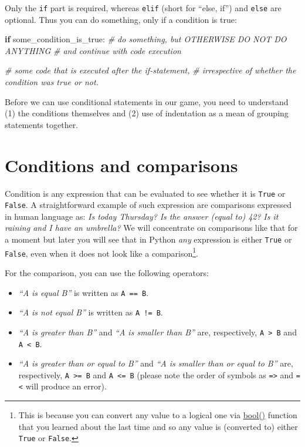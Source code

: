 \documentclass[
]{book}
\newenvironment{Shaded}{\begin{snugshade}}{\end{snugshade}}
\newcommand{\CommentTok}[1]{\textcolor[rgb]{0.56,0.35,0.01}{\textit{#1}}}
\newcommand{\ControlFlowTok}[1]{\textcolor[rgb]{0.13,0.29,0.53}{\textbf{#1}}}
\newcommand{\NormalTok}[1]{#1}
\providecommand{\tightlist}{%
  \setlength{\itemsep}{0pt}\setlength{\parskip}{0pt}}
\begin{document}
Only the \texttt{if} part is required, whereas \texttt{elif} (short for ``else, if'') and \texttt{else} are optional. Thus you can do something, only if a condition is true:

\begin{Shaded}
\begin{Highlighting}[]
\ControlFlowTok{if}\NormalTok{ some\_condition\_is\_true:}
    \CommentTok{\# do something, but OTHERWISE DO NOT DO ANYTHING }
    \CommentTok{\# and continue with code execution}
  
\CommentTok{\# some code that is executed after the if{-}statement,}
\CommentTok{\# irrespective of whether the condition was true or not.}
\end{Highlighting}
\end{Shaded}

Before we can use conditional statements in our game, you need to understand (1) the conditions themselves and (2) use of indentation as a mean of grouping statements together.

\hypertarget{comparisons}{%
\section{Conditions and comparisons}\label{comparisons}}

Condition is any expression that can be evaluated to see whether it is \texttt{True} or \texttt{False}. A straightforward example of such expression are comparisons expressed in human language as: \emph{Is today Thursday?} \emph{Is the answer (equal to) 42?} \emph{Is it raining and I have an umbrella?} We will concentrate on comparisons like that for a moment but later you will see that in Python \emph{any} expression is either \texttt{True} or \texttt{False}, even when it does not look like a comparison\footnote{This is because you can convert any value to a logical one via \href{https://docs.python.org/3/library/functions.html\#bool}{bool()} function that you learned about the last time and so any value is (converted to) either \texttt{True} or \texttt{False}.}.

For the comparison, you can use the following operators:

\begin{itemize}
\tightlist
\item
  \emph{``A is equal B''} is written as \texttt{A\ ==\ B}.
\item
  \emph{``A is not equal B''} is written as \texttt{A\ !=\ B}.
\item
  \emph{``A is greater than B''} and \emph{``A is smaller than B''} are, respectively, \texttt{A\ \textgreater{}\ B} and \texttt{A\ \textless{}\ B}.
\item
  \emph{``A is greater than or equal to B''} and \emph{``A is smaller than or equal to B''} are, respectively, \texttt{A\ \textgreater{}=\ B} and \texttt{A\ \textless{}=\ B} (please note the order of symbols as \texttt{=\textgreater{}} and \texttt{=\textless{}} will produce an error).
\end{itemize}
\end{document}
